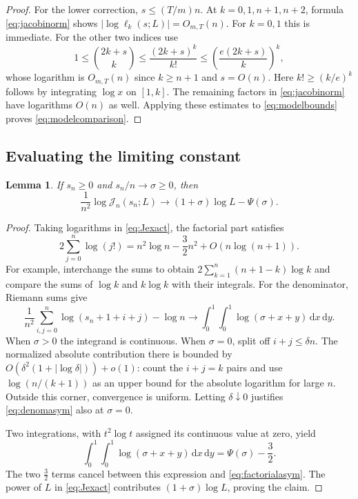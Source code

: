 \documentclass[11pt,a4paper]{article}
\numberwithin{equation}{section}
\newtheorem{lemma}[theorem]{Lemma}
\theoremstyle{remark}\newtheorem{remark}[theorem]{Remark}
\newcommand{\J}{\mathcal J}
\newcommand{\dd}{\,\mathrm d}
\newcommand{\abs}[1]{\lvert#1\rvert}
\begin{document}
\begin{proof}
For the lower correction, $s\leq(T/m)n$. At $k=0,1,n+1,n+2$, formula
\eqref{eq:jacobinorm} shows $\abs{\log\ell_k(s;L)}=O_{m,T}(n)$.
For $k=0,1$ this is immediate. For the other two indices use
\[
 1\leq\binom{2k+s}{k}
 \leq\frac{(2k+s)^k}{k!}
 \leq\left(\frac{e(2k+s)}k\right)^k,
\]
whose logarithm is $O_{m,T}(n)$ since $k\geq n+1$ and $s=O(n)$.
Here $k!\geq(k/e)^k$ follows by integrating $\log x$ on $[1,k]$.
The remaining factors in \eqref{eq:jacobinorm} have logarithms $O(n)$ as well.
Applying these estimates to \eqref{eq:modelbounds} proves
\eqref{eq:modelcomparison}.
\end{proof}

\subsection{Evaluating the limiting constant}
\begin{lemma}\label{lem:modelasym}
If $s_n\geq0$ and $s_n/n\to\sigma\geq0$, then
\begin{equation}\label{eq:modelasym}
 \frac1{n^2}\log\J_n(s_n;L)
 \longrightarrow(1+\sigma)\log L-\Psi(\sigma).
\end{equation}
\end{lemma}
\begin{proof}
Taking logarithms in \eqref{eq:Jexact}, the factorial part satisfies
\begin{equation}\label{eq:factorialasym}
 2\sum_{j=0}^n\log(j!)=n^2\log n-\frac32n^2+O(n\log(n+1)).
\end{equation}
For example, interchange the sums to obtain
$2\sum_{k=1}^n(n+1-k)\log k$ and compare the sums of $\log k$ and $k\log k$
with their integrals.
For the denominator, Riemann sums give
\begin{equation}\label{eq:denomasym}
 \frac1{n^2}\sum_{i,j=0}^n\log(s_n+1+i+j)-\log n
 \longrightarrow\int_0^1\!\int_0^1\log(\sigma+x+y)\dd x\dd y.
\end{equation}
When $\sigma>0$ the integrand is continuous. When $\sigma=0$, split off
$i+j\leq\delta n$. The normalized absolute contribution there is bounded by
$O(\delta^2(1+\abs{\log\delta}))+o(1)$: count the $i+j=k$ pairs and use
$\log(n/(k+1))$ as an upper bound for the absolute logarithm for large $n$.
Outside this corner, convergence is uniform. Letting $\delta\downarrow0$
justifies \eqref{eq:denomasym} also at $\sigma=0$.

Two integrations, with $t^2\log t$ assigned its continuous value at zero,
yield
\[
 \int_0^1\!\int_0^1\log(\sigma+x+y)\dd x\dd y
 =\Psi(\sigma)-\frac32.
\]
The two $\tfrac32$ terms cancel between this expression and
\eqref{eq:factorialasym}. The power of $L$ in \eqref{eq:Jexact} contributes
$(1+\sigma)\log L$, proving the claim.
\end{proof}
\end{document}
